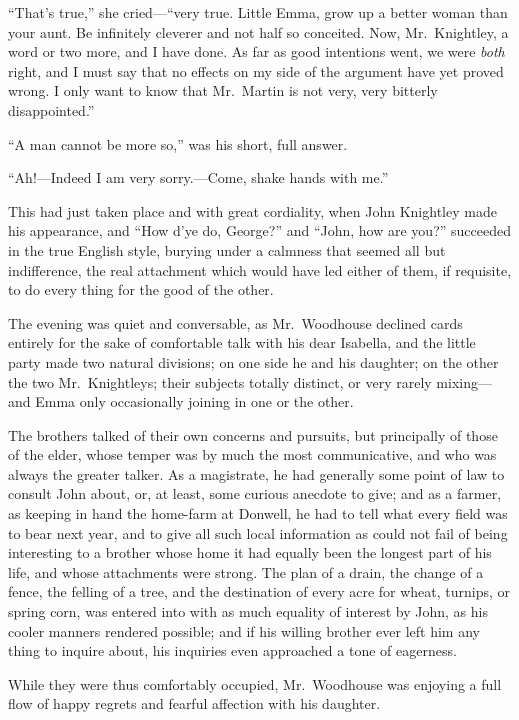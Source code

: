 ``That's true,'' she cried---``very true.  Little Emma, grow up
a better woman than your aunt.  Be infinitely cleverer and not
half so conceited.  Now, Mr.\ Knightley, a word or two more, and I
have done.  As far as good intentions went, we were \emph{both} right,
and I must say that no effects on my side of the argument have yet
proved wrong.  I only want to know that Mr.\ Martin is not very,
very bitterly disappointed.''

``A man cannot be more so,'' was his short, full answer.

``Ah!---Indeed I am very sorry.---Come, shake hands with me.''

This had just taken place and with great cordiality, when John
Knightley made his appearance, and ``How d'ye do, George?'' and ``John,
how are you?'' succeeded in the true English style, burying under
a calmness that seemed all but indifference, the real attachment
which would have led either of them, if requisite, to do every thing
for the good of the other.

The evening was quiet and conversable, as Mr.\ Woodhouse declined
cards entirely for the sake of comfortable talk with his
dear Isabella, and the little party made two natural divisions;
on one side he and his daughter; on the other the two Mr.\ Knightleys;
their subjects totally distinct, or very rarely mixing---and Emma
only occasionally joining in one or the other.

The brothers talked of their own concerns and pursuits, but principally
of those of the elder, whose temper was by much the most communicative,
and who was always the greater talker.  As a magistrate, he had
generally some point of law to consult John about, or, at least,
some curious anecdote to give; and as a farmer, as keeping in hand
the home-farm at Donwell, he had to tell what every field was to bear
next year, and to give all such local information as could not fail
of being interesting to a brother whose home it had equally been
the longest part of his life, and whose attachments were strong.
The plan of a drain, the change of a fence, the felling of a tree,
and the destination of every acre for wheat, turnips, or spring corn,
was entered into with as much equality of interest by John, as his
cooler manners rendered possible; and if his willing brother ever
left him any thing to inquire about, his inquiries even approached
a tone of eagerness.

While they were thus comfortably occupied, Mr.\ Woodhouse was enjoying
a full flow of happy regrets and fearful affection with his daughter.


